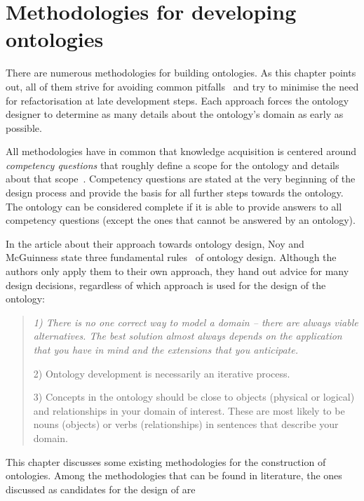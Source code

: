 \chapter{Methodologies for developing ontologies}
\label{ch:development_approaches}

There are numerous methodologies for building ontologies. As this chapter points out, all of them strive for avoiding common pitfalls~\cite{ontology_pitfalls} and try to minimise the need for refactorisation at late development steps. Each approach forces the ontology designer to determine as many details about the ontology's domain as early as possible.

All methodologies have in common that knowledge acquisition is centered around \emph{competency questions} that roughly define a scope for the ontology and details about that scope~\cite{competency_questions}. Competency questions are stated at the very beginning of the design process and provide the basis for all further steps towards the ontology. The ontology can be considered complete if it is able to provide answers to all competency questions (except the ones that cannot be answered by an ontology).

In the article about their approach towards ontology design, Noy and McGuinness state three fundamental rules~\cite{Ontology101} of ontology design. Although the authors only apply them to their own approach, they hand out advice for many design decisions, regardless of which approach is used for the design of the ontology:

\begin{quote}
\itshape
1) There is no one correct way to model a domain -- there are always viable alternatives. The best solution almost always depends on the application that you have in mind and the extensions that you anticipate.

2) Ontology development is necessarily an iterative process.

3) Concepts in the ontology should be close to objects (physical or logical) and relationships in your domain of interest. These are most likely to be nouns (objects) or verbs (relationships) in sentences that describe your domain.\normalfont\cite{Ontology101}
\end{quote}

This chapter discusses some existing methodologies for the construction of ontologies. Among the methodologies that can be found in literature, the ones discussed as candidates for the design of \thinkhomeweather are

